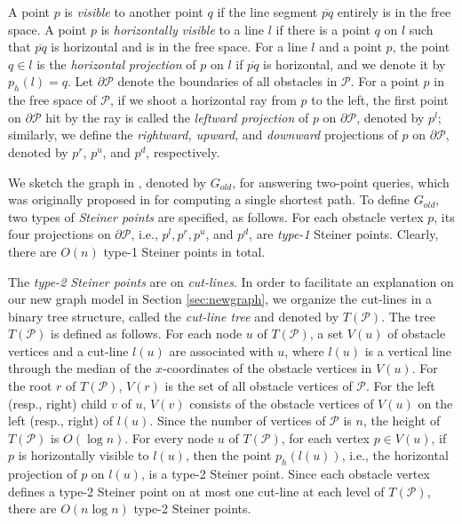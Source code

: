 \documentclass[english,runningheads,11pt]{llncs}
\def\calP{\mathcal{P}}
\begin{document}
A point $p$ is {\em visible} to another point $q$ if the line segment
$\overline{pq}$ entirely is in the free space.
A point $p$ is {\it horizontally} {\it visible} to a line $l$ if
there is a point $q$ on $l$ such that $\overline{pq}$
is horizontal and is in the free space.
For a line $l$ and a point $p$, the point $q\in l$ is the {\em horizontal}
{\it projection} of $p$ on $l$ if $\overline{pq}$ is horizontal, and we denote it by $p_h(l)=q$.
Let $\partial\calP$ denote the boundaries
of all obstacles in $\calP$. For a point $p$ in the free space of
$\calP$, if we shoot a horizontal ray from $p$ to the left, the first point on
$\partial\calP$ hit by the ray is called the {\em leftward projection} of $p$ on
$\partial\calP$, denoted by $p^l$; similarly, we define the
{\em rightward, upward}, and {\em downward} projections of $p$ on
$\partial\calP$, denoted by $p^r$, $p^u$, and $p^d$, respectively.

We sketch the graph in \cite{ref:ChenSh00}, denoted by $G_{old}$,
for answering two-point queries, which was originally proposed in
\cite{ref:ClarksonRe87,ref:ClarksonRe88} for computing a single
shortest path. To define $G_{old}$, two types of
{\em Steiner points} are specified, as follows.
For each obstacle vertex $p$, its
four projections on $\partial\calP$, i.e., $p^l,p^r,p^u$, and $p^d$, are {\em type-1}
Steiner points. Clearly, there are $O(n)$ type-1 Steiner points in total.

The {\em type-2 Steiner points} are on {\em cut-lines}. In
order to facilitate an explanation on our new graph model in Section
\ref{sec:newgraph}, we organize the cut-lines in a binary tree structure,
called the {\em cut-line tree} and denoted by $T(\calP)$. The tree $T(\calP)$ is defined as follows.
For each node $u$ of $T(\calP)$, a set $V(u)$ of obstacle vertices
and a cut-line $l(u)$ are associated with $u$, where $l(u)$ is a
vertical line through the median of the $x$-coordinates of the
obstacle vertices in $V(u)$. For the root $r$ of $T(\calP)$,
$V(r)$ is the set of all obstacle vertices of $\calP$. For the left
(resp., right) child $v$ of $u$, $V(v)$ consists of the obstacle
vertices of $V(u)$ on the left (resp., right) of $l(u)$.
Since the number of vertices of $\calP$ is $n$, the height of
$T(\calP)$ is $O(\log n)$. For every node $u$ of
$T(\calP)$, for each vertex $p\in V(u)$, if $p$ is horizontally visible to
$l(u)$, then the point $p_h(l(u))$, i.e., the horizontal projection of $p$ on
$l(u)$, is a type-2 Steiner point. Since each obstacle vertex defines
a type-2 Steiner point on at most one cut-line at each level of $T(\calP)$,
there are $O(n\log n)$ type-2 Steiner points.
\end{document}
